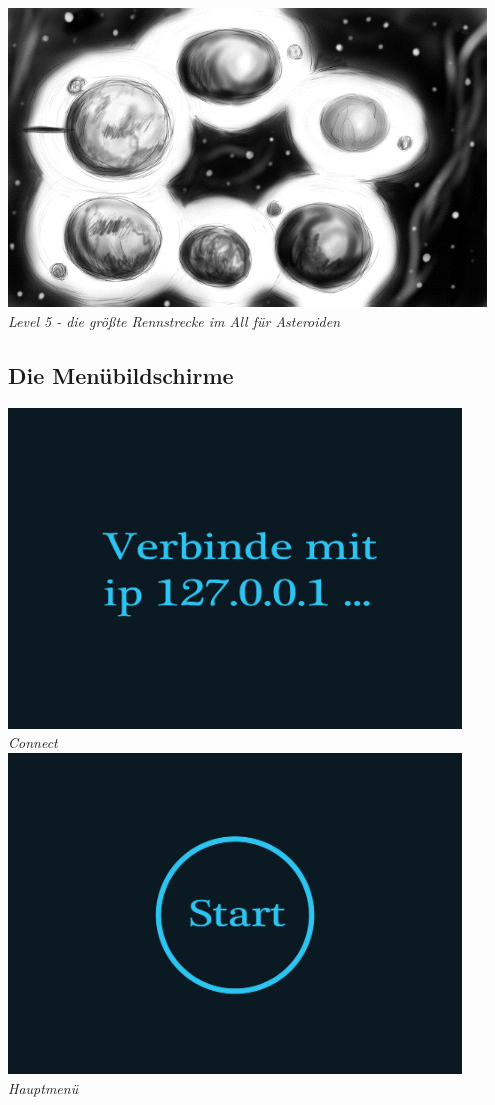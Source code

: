 \begin{flushright}
\includegraphics[width=0.95\textwidth]{img/asteroiden.png}\\
\textit{Level 5 - die größte Rennstrecke im All für Asteroiden}

\newpage

\subsection{Die Menübildschirme}

\includegraphics[width=0.9\textwidth]{img/connect.png}\\
\textit{Connect}\\[1em]

\includegraphics[width=0.9\textwidth]{img/hauptmenu.png}\\
\textit{Hauptmenü}


\end{flushright}
